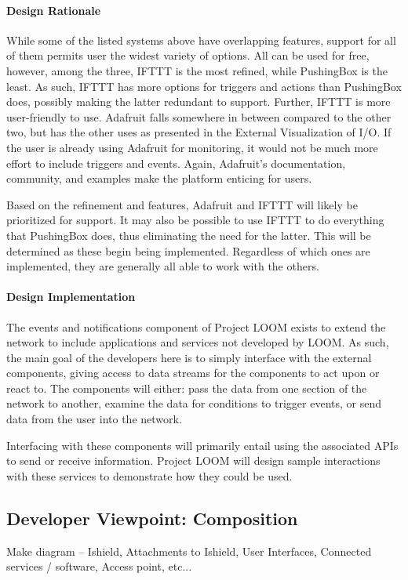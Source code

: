 \documentclass[onecolumn, draftclsnofoot,10pt, compsoc]{IEEEtran}
\begin{document}
\paragraph{Design Rationale}
While some of the listed systems above have overlapping features, support for all of them permits user the widest variety of options. All can be used for free, however, among the three, IFTTT is the most refined, while PushingBox is the least. As such, IFTTT has more options for triggers and actions than PushingBox does, possibly making the latter redundant to support. Further, IFTTT is more user-friendly to use. Adafruit falls somewhere in between compared to the other two, but has the other uses as presented in the External Visualization of I/O. If the user is already using Adafruit for monitoring, it would not be much more effort to include triggers and events. Again, Adafruit's documentation, community, and examples make the platform enticing for users.

Based on the refinement and features, Adafruit and IFTTT will likely be prioritized for support. It may also be possible to use IFTTT to do everything that PushingBox does, thus eliminating the need for the latter. This will be determined as these begin being implemented. Regardless of which ones are implemented, they are generally all able to work with the others.

\paragraph{Design Implementation}
The events and notifications component of Project LOOM exists to extend the network to include applications and services not developed by LOOM. As such, the main goal of the developers here is to simply interface with the external components, giving access to data streams for the components to act upon or react to. The components will either: pass the data from one section of the network to another, examine the data for conditions to trigger events, or send data from the user into the network.

Interfacing with these components will primarily entail using the associated APIs to send or receive information. Project LOOM will design sample interactions with these services to demonstrate how they could be used.






\subsection{Developer Viewpoint: Composition}
Make diagram – Ishield, Attachments to Ishield, User Interfaces, Connected services / software, Access point, etc...
\end{document}
